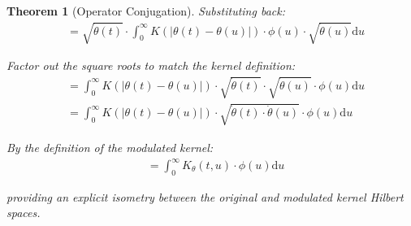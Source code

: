 \documentclass{article}
\newtheorem{theorem}{Theorem}
\newcommand{\dd}{\mathrm{d}}
\newcommand{\dottheta}{\dot{\theta}}
\begin{document}
\begin{theorem}[Operator Conjugation]
Substituting back:
\begin{align}
&= \sqrt{\dottheta(t)} \cdot \int_0^\infty K(|\theta(t)-\theta(u)|) \cdot \phi(u) \cdot \sqrt{\dottheta(u)} \dd u
\end{align}

Factor out the square roots to match the kernel definition:
\begin{align}
&= \int_0^\infty K(|\theta(t)-\theta(u)|) \cdot \sqrt{\dottheta(t)} \cdot \sqrt{\dottheta(u)} \cdot \phi(u) \dd u\\
&= \int_0^\infty K(|\theta(t)-\theta(u)|) \cdot \sqrt{\dottheta(t) \cdot \dottheta(u)} \cdot \phi(u) \dd u
\end{align}

By the definition of the modulated kernel:
\begin{align}
&= \int_0^\infty K_\theta(t,u) \cdot \phi(u) \dd u
\end{align}

providing an explicit isometry between the original and modulated kernel Hilbert spaces.
\end{theorem}
\end{document}
